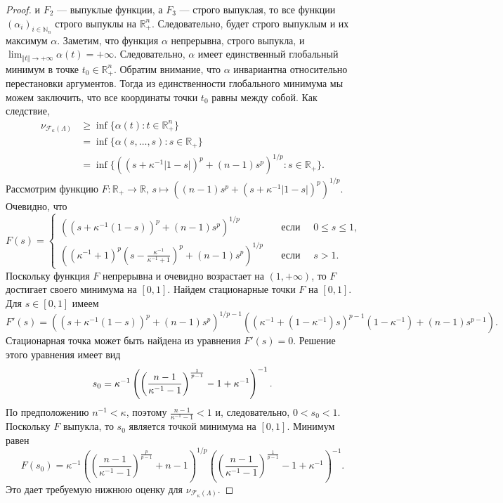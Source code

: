 \documentclass[12pt]{article}
\begin{document}
\begin{proof}
    и $F_2$ --- выпуклые функции, а $F_3$ --- строго выпуклая, то все 
    функции $(\alpha_i)_{i\in\mathbb{N}_n}$ строго выпуклы 
    на $\mathbb{R}_+^n$. Следовательно, будет строго выпуклым и их 
    максимум $\alpha$. Заметим, что функция $\alpha$ непрерывна, строго выпукла, 
    и $\lim_{\Vert t\Vert\to+\infty}\alpha(t)=+\infty$. Следовательно, $\alpha$ 
    имеет единственный глобальный минимум в точке $t_0\in\mathbb{R}_+^n$. Обратим 
    внимание, что $\alpha$ инвариантна относительно перестановки аргументов. 
    Тогда из единственности глобального минимума мы можем заключить, что все 
    координаты точки $t_0$ равны между собой. Как следствие,
    \[
    \begin{aligned}
        \nu_{\mathcal{F}_{\kappa}(\Lambda)}
        &\geq\inf\{\alpha(t) : t\in\mathbb{R}_+^n\} \\
        &=\inf\{\alpha(s,\ldots,s) : s\in\mathbb{R}_+\} \\
        &=\inf\{((s+\kappa^{-1}|1-s|)^p+(n-1)s^p)^{1/p} : s\in\mathbb{R}_+\}.
    \end{aligned}
    \]
    Рассмотрим функцию
    $
        F:\mathbb{R}_+\to\mathbb{R},\,
        s\mapsto ((n-1)s^p+(s+\kappa^{-1}|1-s|)^p)^{1/p}.
    $
    Очевидно, что
    \[
        F(s)=
        \begin{cases}
            ((s+\kappa^{-1}(1-s))^p+(n-1)s^p)^{1/p}
            \quad&\text{если }\quad 0\leq s\leq 1, \\
            \left(
                (\kappa^{-1}+1)^p
                \left(s-\frac{\kappa^{-1}}{\kappa^{-1}+1}\right)^p+
                (n-1)s^p
            \right)^{1/p}
            \quad&\text{если }\quad s>1.
        \end{cases}
    \]
    Поскольку функция $F$ непрерывна и очевидно возрастает на $(1,+\infty)$, 
    то $F$ достигает своего минимума на $[0, 1]$. Найдем стационарные точки 
    $F$ на $[0, 1]$. Для $s\in[0,1]$ имеем
    \[
        F'(s)=
        ((s+\kappa^{-1}(1-s))^p+(n-1)s^p)^{1/p-1}
        ((\kappa^{-1}+(1-\kappa^{-1})s)^{p-1}(1-\kappa^{-1})+(n-1)s^{p-1}).
    \]
    Стационарная точка может быть найдена из уравнения $F'(s)=0$. 
    Решение этого уравнения имеет вид
    \[
        s_0
        =
        \kappa^{-1}
        \left(
            \left(
                \frac{n-1}{\kappa^{-1}-1}
            \right)^{\frac{1}{p-1}}
            -1+\kappa^{-1}
        \right)^{-1}.\\
    \]
    По предположению $n^{-1}<\kappa$, поэтому $\frac{n-1}{\kappa^{-1}-1}<1$ и,
    следовательно, $0<s_0<1$. Поскольку $F$ выпукла, то $s_0$ является точкой 
    минимума на $[0,1]$. Минимум равен
    \[
        F(s_0)
        =\kappa^{-1}
        \left(
            \left(\frac{n-1}{\kappa^{-1}-1}
            \right)^{\frac{p}{p-1}}
            +n-1
        \right)^{1/p}
        \left(
            \left(\frac{n-1}{\kappa^{-1}-1}
            \right)^{\frac{1}{p-1}}
            -1+\kappa^{-1}
        \right)^{-1}.
    \]
    Это дает требуемую нижнюю оценку 
    для $\nu_{\mathcal{F}_{\kappa}(\Lambda)}$.
\end{proof}
\end{document}

